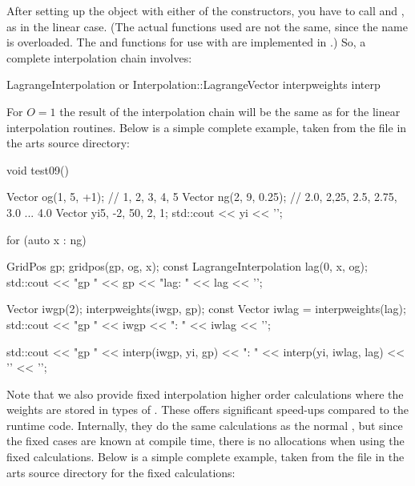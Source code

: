 After setting up the  object with
either of the constructors, you have to call 
and , as in the linear case. (The actual
functions used are not the same, since the name is overloaded. The
 and  functions for use
with  are implemented in
.) So, a complete interpolation chain
involves:

\begin{code}
LagrangeInterpolation or Interpolation::LagrangeVector
interpweights
interp
\end{code}

For $O=1$ the result of the
interpolation chain will be the same as for the linear interpolation
routines. Below is a simple complete example, taken from
the file  in the arts source directory: 

\begin{code}
void test09() {
  Vector og(1, 5, +1);    // 1, 2, 3, 4, 5
  Vector ng(2, 9, 0.25);  // 2.0, 2,25, 2.5, 2.75, 3.0 ... 4.0
  Vector yi{5, -2, 50, 2, 1};
  std::cout << yi << '\n';

  for (auto x : ng) {
    GridPos gp;
    gridpos(gp, og, x);
    const LagrangeInterpolation lag(0, x, og);
    std::cout << "gp " << gp << "lag: " << lag << '\n';

    Vector iwgp(2);
    interpweights(iwgp, gp);
    const Vector iwlag = interpweights(lag);
    std::cout << "gp " << iwgp << "\nlag: " << iwlag << '\n';

    std::cout << "gp " << interp(iwgp, yi, gp)
              << "\nlag: " << interp(yi, iwlag, lag) << '\n'
              << '\n';
  }
}
\end{code}

Note that we also provide fixed interpolation higher order calculations where
the weights are stored in types of .
These offers significant speed-ups compared to the runtime code.  Internally,
they do the same calculations as the normal ,
but since the fixed cases are known at compile time, there is no allocations
when using the fixed calculations. Below is a simple complete example, taken from
the file  in the arts source directory for the fixed calculations: 

